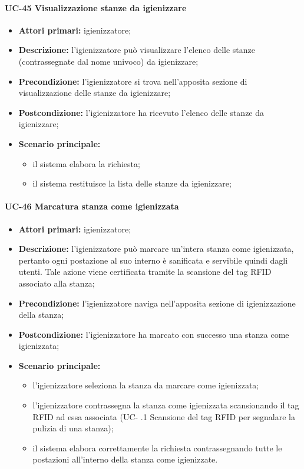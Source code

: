 \paragraph{UC-45 Visualizzazione stanze da igienizzare}

    \begin{itemize}
        \item \textbf{Attori primari:} igienizzatore;
        \item \textbf{Descrizione:} l’igienizzatore può visualizzare l'elenco delle stanze (contrassegnate dal nome univoco) da igienizzare;
        \item \textbf{Precondizione:} l'igienizzatore si trova nell’apposita sezione di visualizzazione delle stanze da igienizzare; 
        \item \textbf{Postcondizione:} l'igienizzatore ha ricevuto l'elenco delle stanze da igienizzare;
        \item \textbf{Scenario principale:} 
            \begin{itemize}
                \item il sistema elabora la richiesta;
                \item il sistema restituisce la lista delle stanze da igienizzare;
            \end{itemize}
    \end{itemize}
\paragraph{UC-46 Marcatura stanza come igienizzata}

    \begin{itemize}
        \item \textbf{Attori primari:} igienizzatore;
        \item \textbf{Descrizione:} l’igienizzatore può marcare un'intera stanza come igienizzata, pertanto ogni postazione al suo interno è sanificata e servibile quindi dagli utenti. Tale azione viene certificata tramite la scansione del tag RFID associato alla stanza;
        \item \textbf{Precondizione:} l'igienizzatore naviga nell’apposita sezione di igienizzazione della stanza; 
        \item \textbf{Postcondizione:} l'igienizzatore ha marcato con successo una stanza come igienizzata;
        \item \textbf{Scenario principale:} 
            \begin{itemize}
                \item l'igienizzatore seleziona la stanza da marcare come igienizzata;	
                \item l'igienizzatore contrassegna la stanza come igienizzata scansionando il tag RFID ad essa associata (UC- .1 Scansione del tag RFID per segnalare la pulizia di una stanza);
                \item il sistema elabora correttamente la richiesta contrassegnando tutte le postazioni all'interno della stanza come igienizzate.
            \end{itemize}
    \end{itemize}

